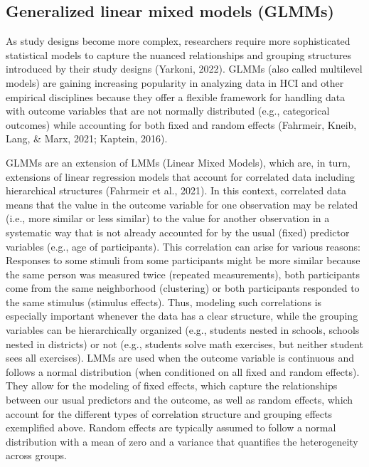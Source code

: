 \documentclass[
  man,floatsintext]{apa6}
\begin{document}
\hypertarget{generalized-linear-mixed-models-glmms}{%
\subsection{Generalized linear mixed models (GLMMs)}\label{generalized-linear-mixed-models-glmms}}

As study designs become more complex, researchers require more sophisticated statistical models to capture the nuanced relationships and grouping structures introduced by their study designs (Yarkoni, 2022). GLMMs (also called multilevel models) are gaining increasing popularity in analyzing data in HCI and other empirical disciplines because they offer a flexible framework for handling data with outcome variables that are not normally distributed (e.g., categorical outcomes) while accounting for both fixed and random effects (Fahrmeir, Kneib, Lang, \& Marx, 2021; Kaptein, 2016).

GLMMs are an extension of LMMs (Linear Mixed Models), which are, in turn, extensions of linear regression models that account for correlated data including hierarchical structures (Fahrmeir et al., 2021).
In this context, correlated data means that the value in the outcome variable for one observation may be related (i.e., more similar or less similar) to the value for another observation in a systematic way that is not already accounted for by the usual (fixed) predictor variables (e.g., age of participants). This correlation can arise for various reasons: Responses to some stimuli from some participants might be more similar because the same person was measured twice (repeated measurements), both participants come from the same neighborhood (clustering) or both participants responded to the same stimulus (stimulus effects).
Thus, modeling such correlations is especially important whenever the data has a clear structure, while the grouping variables can be hierarchically organized (e.g., students nested in schools, schools nested in districts) or not (e.g., students solve math exercises, but neither student sees all exercises).
LMMs are used when the outcome variable is continuous and follows a normal distribution (when conditioned on all fixed and random effects).
They allow for the modeling of fixed effects, which capture the relationships between our usual predictors and the outcome, as well as random effects, which account for the different types of correlation structure and grouping effects exemplified above.
Random effects are typically assumed to follow a normal distribution with a mean of zero and a variance that quantifies the heterogeneity across groups.
\end{document}
